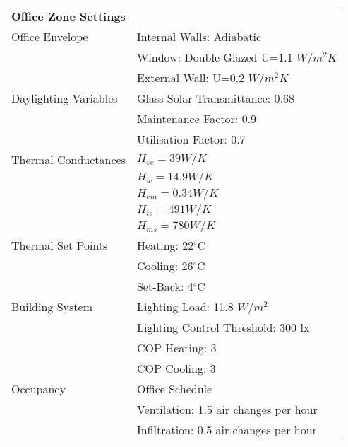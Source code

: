 \begin{table*}
\centering
\begin{tabular*}{\textwidth}{ll}
\hline
\textbf{Office Zone Settings} &                                        \\
Office Envelope               & Internal Walls: Adiabatic              \\
                              & Window: Double Glazed U=1.1 $W/m^2K$     \\
                              & External Wall: U=0.2 $W/m^2K$            \\
Daylighting Variables         & Glass Solar Transmittance: 0.68                          \\
                              & Maintenance Factor: 0.9                \\
                              & Utilisation Factor: 0.7               \\
Thermal Conductances          & $H_{ve}=39 W/K  $                      \\
                              & $H_{w}=14.9 W/K $                      \\
                              & $H_{em}=0.34 W/K$                      \\
                              & $H_{is}=491 W/K $                      \\
                              & $H_{ms}=780 W/K $                      \\
Thermal Set Points            & Heating: 22$^{\circ}$C                 \\
                              & Cooling: 26$^{\circ}$C                 \\
                              & Set-Back: 4$^{\circ}$C                 \\
Building System               & Lighting Load: 11.8 $W/m^2$             \\
                              & Lighting Control Threshold: 300 lx     \\
                              & COP Heating: 3                         \\
                              & COP Cooling: 3                         \\
Occupancy                     & Office Schedule  \cite{CEAToolbox}     \\
                              & Ventilation: 1.5 air changes per hour  \\
                              & Infiltration: 0.5 air changes per hour \\

\end{tabular*}
\end{table*}
